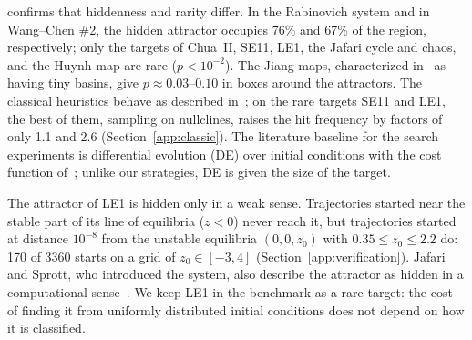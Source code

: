  confirms that hiddenness and rarity differ. In the Rabinovich system and in Wang--Chen \#2, the hidden attractor occupies 76\% and 67\% of the region, respectively; only the targets of Chua~II, SE11, LE1, the Jafari cycle and chaos, and the Huynh map are rare ($p<10^{-2}$). The Jiang maps, characterized in~\cite{Jiang2016Maps} as having tiny basins, give $p\approx0.03$--$0.10$ in boxes around the attractors. The classical heuristics behave as described in~\cite{GuanXie2025}; on the rare targets SE11 and LE1, the best of them, sampling on nullclines, raises the hit frequency by factors of only 1.1 and 2.6 (Section~\ref{app:classic}). The literature baseline for the search experiments is differential evolution (DE) over initial conditions with the cost function of~\cite{Zelinka2016}; unlike our strategies, DE is given the size of the target.

The attractor of LE1 is hidden only in a weak sense. Trajectories started near the stable part of its line of equilibria ($z<0$) never reach it, but trajectories started at distance $10^{-8}$ from the unstable equilibria $(0,0,z_0)$ with $0.35\le z_0\le2.2$ do: 170 of 3360 starts on a grid of $z_0\in[-3,4]$ (Section~\ref{app:verification}). Jafari and Sprott, who introduced the system, also describe the attractor as hidden in a computational sense~\cite{JafariSprott2013}. We keep LE1 in the benchmark as a rare target: the cost of finding it from uniformly distributed initial conditions does not depend on how it is classified.

